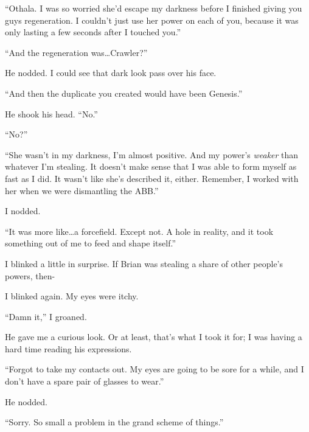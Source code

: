 ``Othala.  I was so worried she'd escape my darkness before I finished giving you guys regeneration.  I couldn't just use her power on each of you, because it was only lasting a few seconds after I touched you.''



``And the regeneration was\ldots Crawler?''



He nodded.  I could see that dark look pass over his face.



``And then the duplicate you created would have been Genesis.''



He shook his head.  ``No.''



``No?''



``She wasn't in my darkness, I'm almost positive.  And my power's \emph{weaker }than whatever I'm stealing.  It doesn't make sense that I was able to form myself as fast as I did.  It wasn't like she's described it, either.  Remember, I worked with her when we were dismantling the ABB.''



I nodded.



``It was more like\ldots a forcefield.  Except not.  A hole in reality, and it took something out of me to feed and shape itself.''



I blinked a little in surprise.  If Brian was stealing a share of other people's powers, then-



I blinked again.  My eyes were itchy.



``Damn it,'' I groaned.



He gave me a curious look.  Or at least, that's what I took it for; I was having a hard time reading his expressions.



``Forgot to take my contacts out.  My eyes are going to be sore for a while, and I don't have a spare pair of glasses to wear.''



He nodded.



``Sorry.  So small a problem in the grand scheme of things.''



